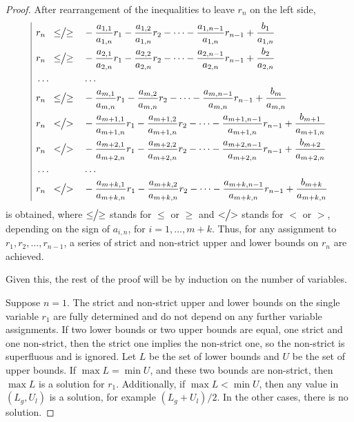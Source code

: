 \documentclass{article}
\newcommand{\mathbig}[1]{\vcenter{\hbox{\scalebox{1.25}{$#1$}}}}
\begin{document}
\begin{proof}
  After rearrangement of the inequalities to leave $r_n$ on the left side,
  \[
  \begin{array}{|l@{}}
    \begin{aligned}
      &r_n \;\; \leq\!\!\mathbig{/}\!\!\geq && - \frac{a_{1, 1}}{a_{1,n}}r_1 - \frac{a_{1, 2}}{a_{1, n}}r_2 - \dots - \frac{a_{1, n - 1}}{a_{1, n}}r_{n - 1} + \frac{b_1}{a_{1, n}} \\
      &r_n \;\; \leq\!\!\mathbig{/}\!\!\geq && - \frac{a_{2, 1}}{a_{2,n}}r_1 - \frac{a_{2, 2}}{a_{2, n}}r_2 - \dots - \frac{a_{2, n - 1}}{a_{2, n}}r_{n - 1} + \frac{b_2}{a_{2, n}} \\
      &\dots&&\dots \\
      &r_n \;\; \leq\!\!\mathbig{/}\!\!\geq && - \frac{a_{m, 1}}{a_{m,n}}r_1 - \frac{a_{m, 2}}{a_{m, n}}r_2 - \dots - \frac{a_{m, n - 1}}{a_{m, n}}r_{n - 1} + \frac{b_m}{a_{m, n}} \\
      &r_n \;\; <\!\!\mathbig{/}\!\!> && - \frac{a_{m+1, 1}}{a_{m+1,n}}r_1 - \frac{a_{m+1, 2}}{a_{m+1, n}}r_2 - \dots - \frac{a_{m+1, n - 1}}{a_{m+1, n}}r_{n - 1} + \frac{b_{m+1}}{a_{m+1, n}} \\
      &r_n \;\; <\!\!\mathbig{/}\!\!> && - \frac{a_{m+2, 1}}{a_{m+2,n}}r_1 - \frac{a_{m+2, 2}}{a_{m+2, n}}r_2 - \dots - \frac{a_{m+2, n - 1}}{a_{m+2, n}}r_{n - 1} + \frac{b_{m+2}}{a_{m+2, n}} \\
      &\dots&&\dots \\
      &r_n \;\; <\!\!\mathbig{/}\!\!> && - \frac{a_{m+k, 1}}{a_{m+k,n}}r_1 - \frac{a_{m+k, 2}}{a_{m+k, n}}r_2 - \dots - \frac{a_{m+k, n - 1}}{a_{m+k, n}}r_{n - 1} + \frac{b_{m+k}}{a_{m+k, n}} \\
    \end{aligned}
  \end{array}
  \]
  is obtained, where $\leq\!\!\mathbig{/}\!\!\geq$ stands for $\leq$ or $\geq$ and $<\!\!\mathbig{/}\!\!>$ stands for $<$ or $>$, depending on the sign of $a_{i, n}$, for $i = 1, \dots, m+k$. Thus, for any assignment to $r_1, r_2, \dots, r_{n-1}$, a series of strict and non-strict upper and lower bounds on $r_n$ are achieved.

  Given this, the rest of the proof will be by induction on the number of variables.

  Suppose $n = 1$. The strict and non-strict upper and lower bounds on the single variable $r_1$ are fully determined and do not depend on any further variable assignments. If two lower bounds or two upper bounds are equal, one strict and one non-strict, then the strict one implies the non-strict one, so the non-strict is superfluous and is ignored. Let $L$ be the set of lower bounds and $U$ be the set of upper bounds. If $\max L = \min U$, and these two bounds are non-strict, then $\max L$ is a solution for $r_1$. Additionally, if $\max L < \min U$, then any value in $(L_g, U_l)$ is a solution, for example $(L_g + U_l)/2$. In the other cases, there is no solution.


\end{proof}
\end{document}
